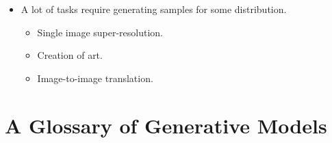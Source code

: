 \documentclass[10pt]{article}
\begin{document}
\begin{itemize}
\begin{itemize}
  	  \item A lot of tasks require generating samples for some distribution.
  	  \begin{itemize}
  	  	\item Single image super-resolution.
  	  	\item Creation of art.
  	  	\item Image-to-image translation.  	  	
  	  \end{itemize}
  	\end{itemize}  	
  \end{itemize}

  \section{A Glossary of Generative Models}
\end{document}
